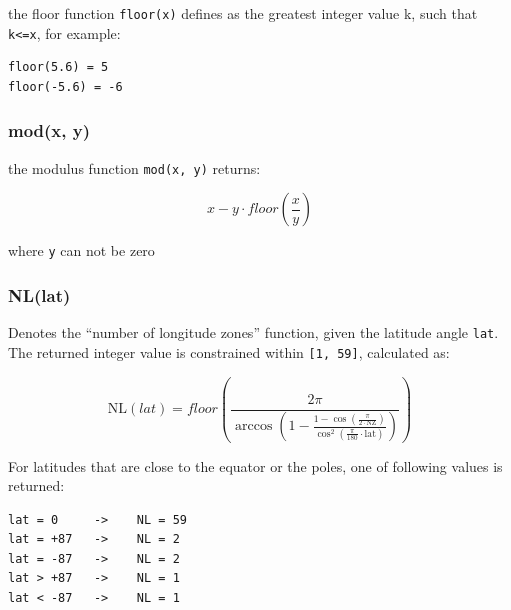 the floor function \texttt{floor(x)} defines as the greatest integer value k, such that \texttt{k\textless{}=x}, for example:

\begin{verbatim}
floor(5.6) = 5
floor(-5.6) = -6
\end{verbatim}

\subsubsection{mod(x, y)}\label{modx-y}

the modulus function \texttt{mod(x,\ y)} returns:

\begin{equation}
  x - y \cdot floor(\frac{x}{y})
\end{equation}

where \texttt{y} can not be zero

\subsubsection{NL(lat)}\label{nllat}

Denotes the ``number of longitude zones'' function, given the latitude angle \texttt{lat}. The returned integer value is constrained within \texttt{{[}1,\ 59{]}}, calculated as:

\begin{equation}
  \text{NL}(lat) = floor \left( \frac{2 \pi}{\arccos(1 - \frac{1-\cos(\frac{\pi}{2 \cdot \text{NZ}})}{\cos^2(\frac{\pi}{180} \cdot \text{lat})}) } \right)
\end{equation}

For latitudes that are close to the equator or the poles, one of following values is returned:

\begin{verbatim}
lat = 0     ->    NL = 59
lat = +87   ->    NL = 2
lat = -87   ->    NL = 2
lat > +87   ->    NL = 1
lat < -87   ->    NL = 1
\end{verbatim}
